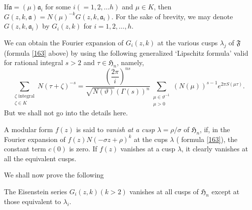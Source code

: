 If\pageoriginale $\mathfrak{a}=(\mu)\mathfrak{a}_{i}$ for some
$i(=1,2,\ldots h)$ and $\mu\in K$, then
$G(z,k,\mathfrak{a})=N(\mu)^{-k}G(z,k,\mathfrak{a}_{i})$. For the sake
of brevity, we may denote $G(z,k,\mathfrak{a}_{i})$ by $G_{i}(z,k)$
for $i=1,2,\ldots,h$.

We can obtain the Fourier expansion of $G_{i}(z,k)$ at the various
cusps $\lambda_{j}$ of $\mathfrak{F}$ (\cf formula \eqref{163} above)
by using the following generalized `Lipschitz formula' valid for
rational integral $s>2$ and $\tau \in\mathfrak{H}_{n}$, namely, 
\begin{equation*}
\sum_{\substack{\zeta\text{ integral}\\ \zeta\in
    K}}N(\tau+\zeta)^{-s}=\frac{\left(\dfrac{2\pi}{i}\right)^{ns}}{\sqrt{N(\vartheta)}(\Gamma(s))^{n}}\sum_{\substack{\mu\in\vartheta^{-1}\\ \mu>0}}(N(\mu))^{s-1}e^{2\pi
  S(\mu\tau)}.\tag{171} \label{171}
\end{equation*}
But we shall not go into the details here.

A modular form $f(z)$ is said to {\em vanish at a cusp}
$\lambda=\rho/\sigma$ of $\mathfrak{H}_{n}$, if, in the Fourier
expansion of $f(z)N(-\sigma z+\rho)^{k}$ at the cups $\lambda$ (\cf
formula \eqref{163}), the constant term $c(0)$ is zero. If $f(z)$
vanishes at a cusp $\lambda$, it clearly vanishes at all the
equivalent cusps.

We shall now prove the following

\begin{proposition}\label{prop25}
The Eisenstein series $G_{i}(z,k)(k>2)$ vanishes at all cusps of
$\mathfrak{H}_{n}$ except at those equivalent to $\lambda_{i}$.
\end{proposition}

